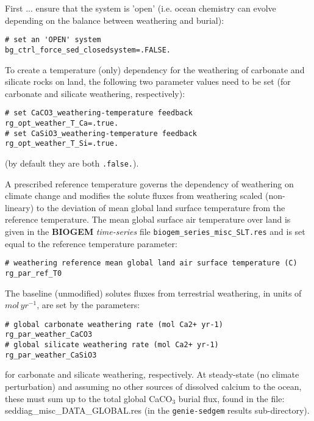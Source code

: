 \noindent First ... ensure that the system is 'open' (i.e. ocean chemistry can evolve depending on the balance between weathering and burial):
\vspace{-1mm}\small\begin{verbatim}
# set an 'OPEN' system
bg_ctrl_force_sed_closedsystem=.FALSE.
\end{verbatim}\normalsize\vspace{-1mm}

\vspace{1mm}
To create a temperature (only) dependency for the weathering of carbonate and silicate rocks on land, the following two parameter values need to be set (for carbonate and silicate weathering, respectively):
\vspace{-1mm}\small\begin{verbatim}
# set CaCO3_weathering-temperature feedback
rg_opt_weather_T_Ca=.true.
# set CaSiO3_weathering-temperature feedback
rg_opt_weather_T_Si=.true.
\end{verbatim}\normalsize\vspace{-1mm}
(by default they are both \texttt{.false.}).

\vspace{1mm}
A prescribed reference temperature governs the dependency of weathering on climate change and modifies the solute fluxes from weathering scaled (non-lineary) to the deviation of mean global land surface temperature from the reference temperature. The mean global  surface air temperature over land is given in the \textbf{BIOGEM} \textit{time-series} file \texttt{biogem\_series\_misc\_SLT.res} and is set equal to the reference temperature parameter: 
\vspace{-1mm}\small\begin{verbatim}
# weathering reference mean global land air surface temperature (C)
rg_par_ref_T0
\end{verbatim}\normalsize\vspace{-1mm}

\vspace{1mm}
The baseline (unmodified) solutes fluxes from terrestrial weathering, in units of \(mol\,yr^{-1}\), are set by the parameters:
\vspace{-1mm}\small\begin{verbatim}
# global carbonate weathering rate (mol Ca2+ yr-1)
rg_par_weather_CaCO3
# global silicate weathering rate (mol Ca2+ yr-1)
rg_par_weather_CaSiO3
\end{verbatim}\normalsize\vspace{-1mm}
for carbonate and silicate weathering, respectively. At steady-state (no climate perturbation) and assuming no other sources of dissolved calcium to the ocean, these must sum up to the total global CaCO$_{3}$ burial flux, found in the file:\\\textsf{\footnotesize seddiag\_misc\_DATA\_GLOBAL.res} (in the \texttt{genie-sedgem} results sub-directory).

